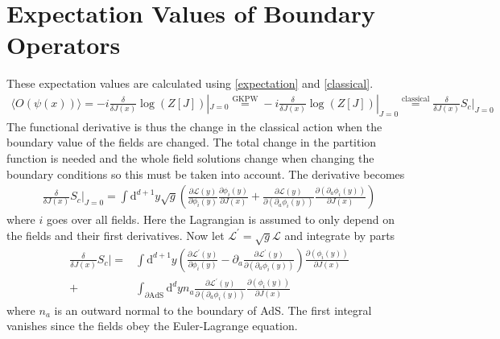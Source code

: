 \documentclass[12pt]{report}
\renewcommand{\d}{\ensuremath{\mathrm{d}}}
\renewcommand{\L}{\ensuremath{\mathcal{L}}}
\begin{document}
\section{Expectation Values of Boundary Operators}
These expectation values are calculated using \eqref{expectation} and \eqref{classical}.
\begin{equation}
\begin{split}
\langle O(\psi(x))\rangle=-i\frac{\delta}{\delta J(x)}\log(Z[J])|_{J=0}\stackrel{\mathrm{GKPW}}{=}-i\frac{\delta}{\delta J(x)}\log(Z[J])|_{J=0}\stackrel{\mathrm{classical}}{=}\frac{\delta}{\delta J(x)}S_c|_{J=0}
\end{split}
\end{equation}
The functional derivative is thus the change in the classical action when the boundary value of the fields are changed. The total change in the partition function is needed and the whole field solutions change when changing the boundary conditions so this must be taken into account. The derivative becomes
\begin{equation}
\begin{split}
\frac{\delta}{\delta J(x)}S_c|_{J=0}=\int \d^{d+1}y\sqrt{g}\left(\frac{\partial\L(y)}{\partial \phi_i(y)}\frac{\partial \phi_i(y)}{\partial J(x)}+\frac{\partial\L(y)}{\partial (\partial_a\phi_i(y))}\frac{\partial (\partial_a\phi_i(y))}{\partial J(x)}\right)
\end{split}
\end{equation}
where $i$ goes over all fields. Here the Lagrangian is assumed to only depend on the fields and their first derivatives. Now let $\L^\prime=\sqrt{g}\L$ and integrate by parts
\begin{equation}
\begin{split}
\frac{\delta}{\delta J(x)}S_c|=&\int \d^{d+1}y\left(\frac{\partial\L^\prime(y)}{\partial \phi_i(y)}-\partial_a\frac{\partial\L^\prime(y)}{\partial (\partial_a\phi_i(y))}\right)\frac{\partial (\phi_i(y))}{\partial J(x)}\\
+&\int_{\partial\mathrm{AdS}} \d^{d}yn_a\frac{\partial\L^\prime(y)}{\partial (\partial_a\phi_i(y))}\frac{\partial (\phi_i(y))}{\partial J(x)}
\end{split}
\end{equation}
where $n_a$ is an outward normal to the boundary of AdS.
The first integral vanishes since the fields obey the Euler-Lagrange equation.
\end{document}
